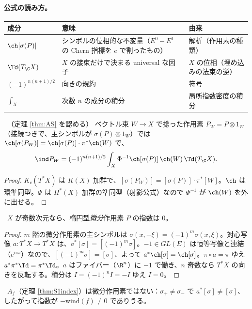 \paragraph{公式の読み方。}
\begin{center}
{\small\begin{tabular}{p{3cm}|p{5.5cm}|p{5cm}}
\toprule
成分 & 意味 & 由来\\
\midrule
$\ch[\sigma(P)]$ & シンボルの位相的な不変量（$E^0-E^1$ の Chern 指標を $e$ で割ったもの） & 解析（作用素の種類）\\
$\Td(T_{\C}X)$ & $X$ の接束だけで決まる universal な因子 & $X$ の位相（埋め込みの法束の逆）\\
$(-1)^{n(n+1)/2}$ & 向きの規約 & 符号\\
$\int_X$ & 次数 $n$ の成分の積分 & 局所指数密度の積分\\
\bottomrule
\end{tabular}}
\end{center}
\begin{prop}[捻りと積]\label{prop:twist}\tP\ （定理 \ref{thm:AS} を認める）
ベクトル束 $W\to X$ で捻った作用素 $P_W=P\otimes1_W$（接続つきで、主シンボルが $\sigma(P)\otimes1_W$）では $\ch[\sigma(P_W)]=\ch[\sigma(P)]\cdot\pi^*\ch(W)$ で、
\[
\ind P_W=(-1)^{n(n+1)/2}\int_X\Phi^{-1}\ch[\sigma(P)]\,\ch(W)\,\Td(T_{\C}X).
\]
\end{prop}
\begin{proof}
$K_c(T^*X)$ は $K(X)$ 加群で、$[\sigma(P_W)]=[\sigma(P)]\cdot\pi^*[W]$。$\ch$ は環準同型。$\Phi$ は $H^*(X)$ 加群の準同型（射影公式）なので $\Phi^{-1}$ が $\ch(W)$ を外に出せる。
\end{proof}
\begin{cor}[奇数次元]\label{cor:odd}\tP\
$X$ が奇数次元なら、楕円型\emph{微分}作用素 $P$ の指数は $0$。
\end{cor}
\begin{proof}
$m$ 階の微分作用素の主シンボルは $\sigma(x,-\xi)=(-1)^m\sigma(x,\xi)$。対心写像 $a:T^*X\to T^*X$ は、$a^*[\sigma]=[(-1)^m\sigma]$。$-1\in GL(E)$ は恒等写像と連結（$e^{i\pi s}$）なので、$[(-1)^m\sigma]=[\sigma]$、よって $a^*\ch[\sigma]=\ch[\sigma]$。$\pi\circ a=\pi$ ゆえ $a^*\pi^*\Td=\pi^*\Td$。$a$ はファイバー（$\R^n$）に $-1$ で働き、$n$ 奇数なら $T^*X$ の向きを反転する。積分は $I=(-1)^nI=-I$ ゆえ $I=0$。
\end{proof}
\begin{ex}[$S^1$ との対比]\tP\
$A_f$（定理 \ref{thm:S1index}）は微分作用素ではない：$\sigma_+\ne\sigma_-$ で $a^*[\sigma]\ne[\sigma]$、したがって指数が $-\mathrm{wind}(f)\ne0$ でありうる。
\end{ex}
